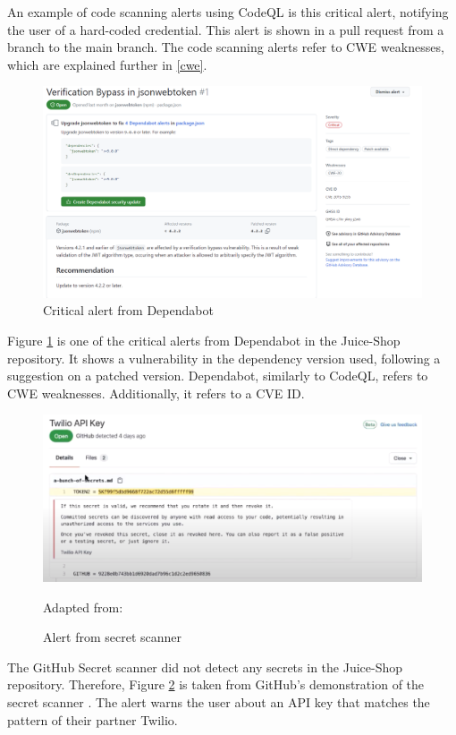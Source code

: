 An example of code scanning alerts using CodeQL is this critical alert, notifying the user of a hard-coded credential. This alert is shown in a pull request from a branch to the main branch. The code scanning alerts refer to CWE weaknesses, which are explained further in \ref{cwe}.

\vspace{2mm}
\begin{figure}[H]
    \centering
    \includegraphics[width=0.8\columnwidth]{Images/dependabotalert.png}
    \caption{Critical alert from Dependabot}
    \label{fig: Critical alert from Dependabot}
\end{figure}

Figure \ref{fig: Critical alert from Dependabot} is one of the critical alerts from Dependabot in the Juice-Shop repository. It shows a vulnerability in the dependency version used, following a suggestion on a patched version. Dependabot, similarly to CodeQL, refers to CWE weaknesses. Additionally, it refers to a CVE ID. 

\vspace{2mm}
\begin{figure}[H]
    \centering
    \includegraphics[width=0.8\columnwidth]{Images/secretscanneralert.png}
    \caption{Alert from secret scanner} Adapted from: \cite{GitHubVideo}
    \label{fig: Alert from secret scanner}
\end{figure}
The GitHub Secret scanner did not detect any secrets in the Juice-Shop repository. Therefore, Figure \ref{fig: Alert from secret scanner} is taken from GitHub's demonstration of the secret scanner \cite{GitHubVideo}. The alert warns the user about an API key that matches the pattern of their partner Twilio. 

